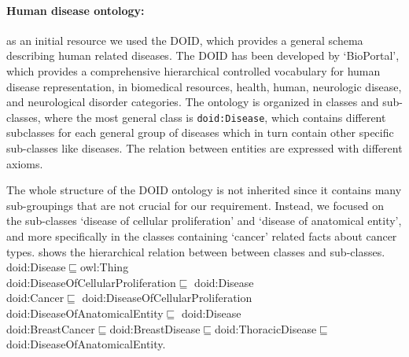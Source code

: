 \paragraph{Human disease ontology:} \hspace*{-2.5mm} as an initial resource we used the DOID, which provides a general schema describing human related diseases. The DOID has been developed by `BioPortal', which provides a comprehensive hierarchical controlled vocabulary for human disease representation, in biomedical resources, health, human, neurologic disease, and neurological disorder categories. The ontology is organized in classes and sub-classes, where the most general class is \texttt{doid:Disease}, which contains different subclasses for each general group of diseases which in turn contain other specific sub-classes like diseases. The relation between entities are expressed with different axioms. 

\hspace*{3.5mm} The whole structure of the DOID ontology is not inherited since it contains many sub-groupings that are not crucial for our requirement. Instead, we focused on the sub-classes `disease of cellular proliferation' and `disease of anatomical entity', and more specifically in the classes containing `cancer' related facts about cancer types.  shows the hierarchical relation between between classes and sub-classes. \\ 

\vspace{-4mm}
{\scriptsize 
    \hspace{-1mm} doid:Disease$\sqsubseteq$owl:Thing \\
    \hspace{2mm} doid:DiseaseOfCellularProliferation$\sqsubseteq$ doid:Disease\\
    \hspace{2mm} doid:Cancer$\sqsubseteq$ doid:DiseaseOfCellularProliferation\\
    \hspace{2mm} doid:DiseaseOfAnatomicalEntity$\sqsubseteq$ doid:Disease\\ 
    \hspace{2mm} doid:BreastCancer$\sqsubseteq$doid:BreastDisease$\sqsubseteq$doid:ThoracicDisease$  \sqsubseteq$doid:DiseaseOfAnatomicalEntity.} \\

\vspace{-4mm}

